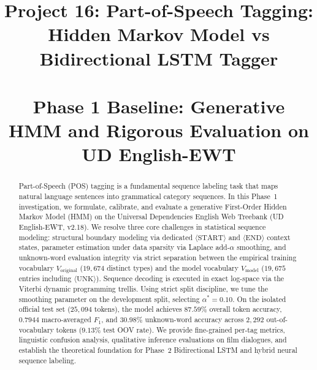 \documentclass[conference]{IEEEtran}
\begin{document}
\title{Project 16: Part-of-Speech Tagging: Hidden Markov Model vs Bidirectional LSTM Tagger \\ \\
\Large Phase 1 Baseline: Generative HMM and Rigorous Evaluation on UD English-EWT}

\author{
}

\maketitle

\begin{abstract}
Part-of-Speech (POS) tagging is a fundamental sequence labeling task that maps natural language sentences into grammatical category sequences. In this Phase~1 investigation, we formulate, calibrate, and evaluate a generative First-Order Hidden Markov Model (HMM) on the Universal Dependencies English Web Treebank (UD English-EWT, v2.18). We resolve three core challenges in statistical sequence modeling: structural boundary modeling via dedicated $\langle\text{START}\rangle$ and $\langle\text{END}\rangle$ context states, parameter estimation under data sparsity via Laplace add-$\alpha$ smoothing, and unknown-word evaluation integrity via strict separation between the empirical training vocabulary $V_{\text{original}}$ ($19,674$ distinct types) and the model vocabulary $V_{\text{model}}$ ($19,675$ entries including $\langle\text{UNK}\rangle$). Sequence decoding is executed in exact log-space via the Viterbi dynamic programming trellis. Using strict split discipline, we tune the smoothing parameter on the development split, selecting $\alpha^* = 0.10$. On the isolated official test set ($25,094$ tokens), the model achieves $87.59\%$ overall token accuracy, $0.7944$ macro-averaged $F_1$, and $30.98\%$ unknown-word accuracy across $2,292$ out-of-vocabulary tokens ($9.13\%$ test OOV rate). We provide fine-grained per-tag metrics, linguistic confusion analysis, qualitative inference evaluations on film dialogues, and establish the theoretical foundation for Phase~2 Bidirectional LSTM and hybrid neural sequence labeling.
\end{abstract}
\end{document}
